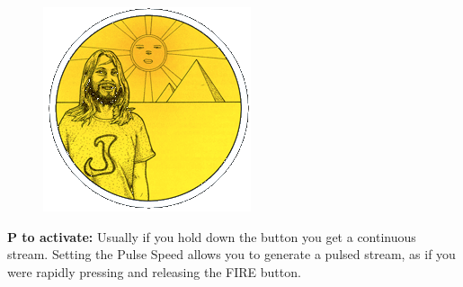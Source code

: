 \begin{definition}
\setlength{\intextsep}{0pt}%
\setlength{\columnsep}{3pt}%
\begin{figure}
\includegraphics[width=\linewidth]{src/callout/psych.png} 
\end{figure}
\small
\textbf{P to activate:} Usually if you hold down the button
you get a continuous stream. Setting the Pulse Speed allows you to
generate a pulsed stream, as if you were rapidly pressing and
releasing the FIRE button.
\\
\end{definition}




